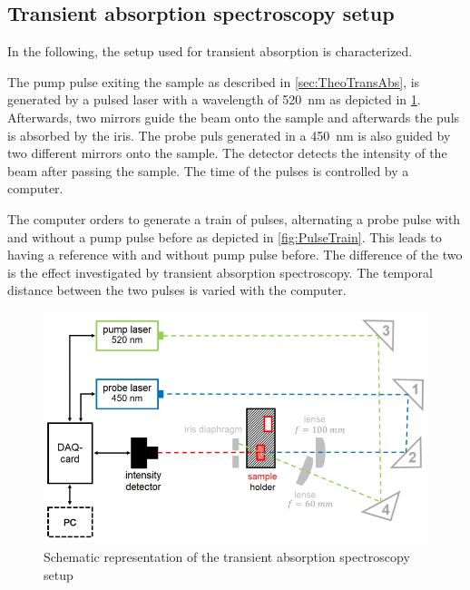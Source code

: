 \subsection{Transient absorption spectroscopy setup}

In the following, the setup used for transient absorption is characterized. 

The pump pulse exiting the sample as described in \cref{sec:TheoTransAbs}, is generated by a pulsed laser with a wavelength of \SI{520}{\nano\meter} as depicted in \cref{fig:TRANSsetup}.
Afterwards, two mirrors guide the beam onto the sample and afterwards the puls is absorbed by the iris. The probe puls generated in a \SI{450}{\nano\meter} is  also guided by two different mirrors onto the sample. 
The detector detects the intensity of the beam after passing the sample. The time of the pulses is controlled by a computer. 

The computer orders to generate a train of pulses, alternating a probe pulse with and without a pump pulse before as depicted in \cref{fig:PulseTrain}. This leads to having a reference with and without pump pulse before. The difference of the two is the effect investigated by transient absorption spectroscopy. 
The temporal distance between the two pulses is varied with the computer.
\begin{figure}[ht]
    \centering
    \includegraphics[width = 13cm]{Bilder/Grundlagen/TRANSsetup.png}
    \caption{Schematic representation of the transient absorption spectroscopy setup}
    \label{fig:TRANSsetup}
\end{figure}

